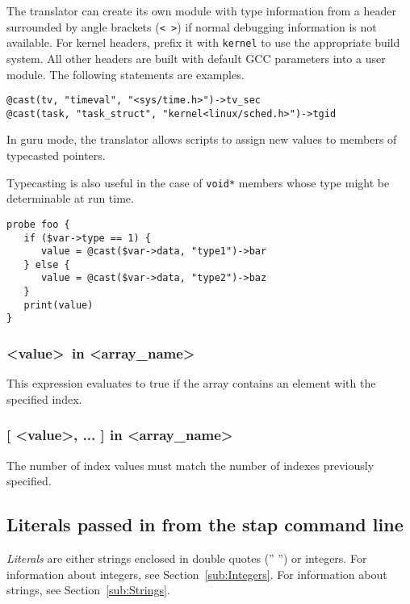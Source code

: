 \documentclass[twoside,english]{article}
\newenvironment{vindent}
{\begin{list}{}{\setlength{\listparindent}{6pt}}
\item[]}
{\end{list}}
\begin{document}
The translator can create its own module with type information from a
header surrounded by angle brackets (\texttt{< >}) if normal debugging
information is not available.  For kernel headers, prefix it with
\texttt{kernel} to use the appropriate build system.  All other
headers are built with default GCC parameters into a user module. The
following statements are examples.
\begin{vindent}
\begin{verbatim}
@cast(tv, "timeval", "<sys/time.h>")->tv_sec
@cast(task, "task_struct", "kernel<linux/sched.h>")->tgid
\end{verbatim}
\end{vindent}

In guru mode, the translator allows scripts to assign new values to
members of typecasted pointers.

Typecasting is also useful in the case of \texttt{void*} members whose
type might be determinable at run time.
\begin{vindent}
\begin{verbatim}
probe foo {
   if ($var->type == 1) {
      value = @cast($var->data, "type1")->bar
   } else {
      value = @cast($var->data, "type2")->baz
   }
   print(value)
}
\end{verbatim}
\end{vindent}


\subsubsection{\textless value\textgreater\ in \textless array\_name\textgreater}
This expression evaluates to true if the array contains an element with the
specified index.


\subsubsection{{[} \textless value\textgreater, ... ] in \textless array\_name\textgreater}

The number of index values must match the number of indexes previously specified.

\subsection{Literals passed in from the stap command line\label{sub:Literals-passed-in}}
\emph{Literals} are either strings enclosed in double quotes ('' '') or
integers. For information about integers, see Section~\ref{sub:Integers}.
For information about strings, see Section~\ref{sub:Strings}.
\end{document}
